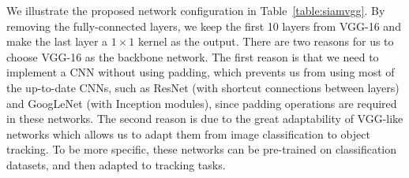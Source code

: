 \documentclass[runningheads]{llncs}
\begin{document}
We illustrate the proposed network configuration in Table~\ref{table:siamvgg}. By removing the fully-connected layers, we keep the first 10 layers from VGG-16 and 
make the last layer a $1 \times 1$ kernel as the output. There are two reasons for us to choose VGG-16 as the backbone network. The first reason is that we need to implement a CNN without using padding, which prevents us from using most of the up-to-date CNNs, such as ResNet (with shortcut connections between layers) and GoogLeNet (with Inception modules), since padding operations are required in these networks. 
The second reason is due to the great adaptability of VGG-like networks which allows us to adapt them from image classification to object tracking. To be more specific, these networks can be pre-trained on classification datasets, and then adapted to tracking tasks. 
\setlength{\tabcolsep}{4pt}
\end{document}
